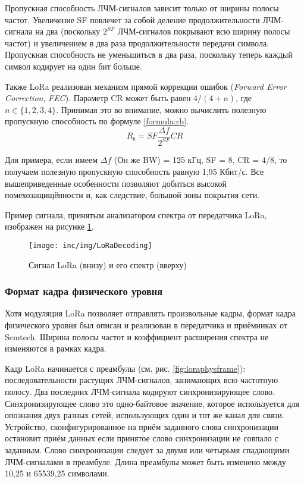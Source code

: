 Пропускная способность ЛЧМ-сигналов зависит только от ширины полосы частот.
Увеличение SF повлечет за собой деление продолжительности ЛЧМ-сигнала на два 
(поскольку $2^{SF}$ ЛЧМ-сигналов покрывают всю ширину полосы частот) и 
увеличением в два раза продолжительности передачи символа.
Пропускная способность не уменьшиться в два раза, поскольку теперь каждый символ кодирует на один бит больше.

Также LoRa реализован механизм прямой коррекции ошибок (\textit{Forward Error Correction}, \textit{FEC}).
Параметр CR может быть равен $4/(4+n)$, где $n \in \{1, 2, 3, 4\}$.
Принимая это во внимание, можно вычислить полезную пропускную способность по формуле \ref{formula:rb}.
\begin{equation}
 R_b = SF \frac{\Delta f}{2^{SF}} CR \label{formula:rb}
\end{equation}

Для примера, если имеем $\Delta f$ (Он же BW) = 125 кГц, SF = 8, CR = $4/8$, то 
получаем полезную пропускную способность равную 1,95 Кбит/с.
Все вышеприведенные особенности позволяют добиться высокой помехозащищённости и, как следствие, большой зоны покрытия сети.

Пример сигнала, принятым анализатором спектра от передатчика LoRa, изображен на рисунке \ref{fig:loradecoding}.

\begin{figure}[!h]
  \centering
  \texttt{[image: inc/img/LoRaDecoding]}
  \caption{Сигнал LoRa (внизу) и его спектр (вверху) \cite{DecodingLora2018}}
  \label{fig:loradecoding}
\end{figure}

\subsubsection{Формат кадра физического уровня}\label{part:physframe}

Хотя модуляция LoRa позволяет отправлять произвольные кадры, формат кадра физического уровня был описан и реализован в передатчика и приёмниках от Semtech.
Ширина полосы частот и коэффициент расширения спектра не изменяются в рамках кадра.

Кадр LoRa начинается с преамбулы (см. рис. \ref{fig:loraphysframe}): 
последовательности растущих ЛЧМ-сигналов, занимающих всю частотную полосу.
Два последних ЛЧМ-сигнала кодируют синхронизирующее слово.
Синхронизирующее слово это одно-байтовое значение, которое используется для опознания двух разных сетей, использующих один и тот же канал для связи. 
Устройство, сконфигурированное на приём заданного слова синхронизации остановит приём данных если принятое слово синхронизации не совпало с заданным.
Слово синхронизации следует за двумя или четырьмя спадающими ЛЧМ-сигналами в 
преамбуле.
Длина преамбулы может быть изменено между 10,25 и 65539,25 символами.

